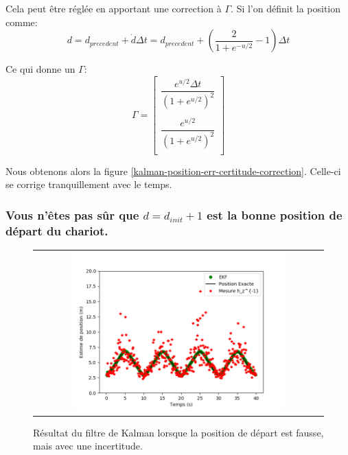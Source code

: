 \documentclass[12pt]{article}
\begin{document}
Cela peut être réglée en apportant une correction à $\Gamma$.
Si l'on définit la position comme:
\begin{equation}
    d = d_{precedent} + \dot{d} \Delta t
    = d_{precedent} + \left(\dfrac{2}{1+e^{-u/2}}-1\right) \Delta t
\end{equation}
%
%

Ce qui donne un $\Gamma$:
\begin{equation}
\Gamma =
\begin{bmatrix}
    \dfrac{e^{u/2} \Delta t}{(1+e^{u/2})^2}   \\
    \\
    \dfrac{e^{u/2}}{(1+e^{u/2})^2} \\
\end{bmatrix}
\end{equation}


Nous obtenons alors la figure \ref{kalman-position-err-certitude-correction}.
Celle-ci se corrige tranquillement avec le temps.

\subsubsection{Vous n'êtes pas sûr que $d=d_{init}+1$ est la bonne position de départ du chariot.}

\begin{figure}[ht]
 \begin{center}
  \begin{tabular}{c}
    \includegraphics[width=0.75\textwidth]{fig/kalman-position-err-incertitude.png}
  \end{tabular}
 \end{center}
\vspace{-0.25in}
    \caption{Résultat du filtre de Kalman lorsque la position de départ est fausse, mais avec une incertitude.}
    \label{kalman-position-err-incertitude}
\end{figure}
\end{document}

